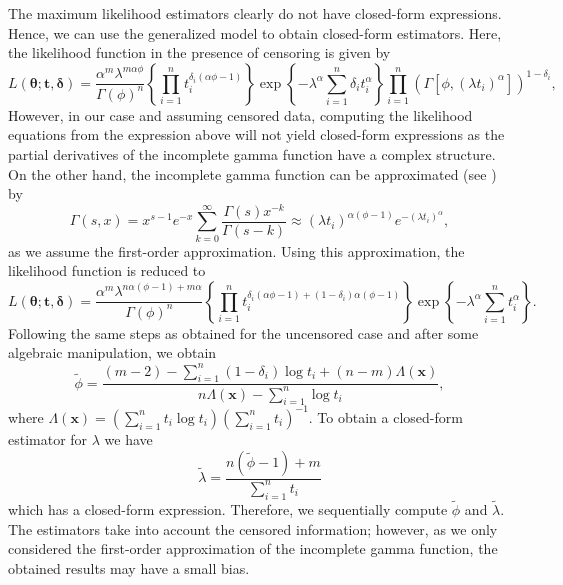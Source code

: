 \documentclass[10pt,a4paper,onecolumn]{article} %
\newcommand{\bs}{\boldsymbol}
\begin{document}
The maximum likelihood estimators clearly do not have closed-form expressions. Hence, we can use the generalized model to obtain closed-form estimators. Here, the likelihood function in the presence of censoring is given by
\begin{equation*}L(\boldsymbol{\theta; t,\delta})
=\frac{\alpha^m\lambda^{m\alpha\phi}}{\Gamma(\phi)^n}\left\{\prod_{i=1}^n{t_i^{\delta_i(\alpha\phi-1)}}\right\}\exp\left\{-\lambda^{\alpha}\sum_{i=1}^n {\delta_i}t_i^{\alpha}\right\}\prod_{i=1}^n\left(\Gamma[\phi,(\lambda t_i)^{\alpha}]\right)^{1-\delta_i},
\end{equation*}
 However, in our case and assuming censored data, computing the likelihood equations from the expression above will not yield closed-form expressions as the partial derivatives of the incomplete gamma function have a complex structure. On the other hand, the incomplete gamma function can be approximated (see \cite{abramowitz}) by
\begin{equation*} \Gamma(s,x) = x^{s-1}e^{-x}\sum_{k=0}^{\infty} \frac{\Gamma(s)x^{-k}}{\Gamma(s-k)}\approx (\lambda t_i)^{\alpha(\phi-1)}e^{-(\lambda t_i)^{\alpha}},
\end{equation*}
as we assume the first-order approximation. Using this approximation, the likelihood function is reduced to
\begin{equation*}L(\bs{\theta;t,\delta})
=\frac{\alpha^m\lambda^{n\alpha(\phi-1)+m\alpha}}{\Gamma(\phi)^n}\left\{\prod_{i=1}^n{t_i^{\delta_i(\alpha\phi-1)+(1-\delta_i)\alpha(\phi-1)}}\right\}\exp\left\{-\lambda^{\alpha}\sum_{i=1}^n t_i^{\alpha}\right\}.
\end{equation*}
Following the same steps as obtained for the uncensored case and after some algebraic manipulation, we obtain
\begin{equation}\label{init1} 
\tilde{\phi} = \frac{(m-2) - \sum_{i=1}^n(1-\delta_i)\log t_i + (n-m)\Lambda(\bs{x}) }{n\Lambda(\bs{x})-\sum_{i=1}^n \log t_i}, 
\end{equation}
where $\Lambda(\bs{x}) = \left(\sum_{i=1}^n t_i\log t_i\right)\left(\sum_{i=1}^n t_i\right)^{-1}$. To obtain a closed-form estimator for $\lambda$ we have
\begin{equation}\label{init2}
\tilde{\lambda} = \frac{n(\tilde{\phi}-1)+m}{\sum_{i=1}^n t_i}
\end{equation}
which has a closed-form expression. Therefore, we sequentially compute $\tilde{\phi}$ and $\tilde{\lambda}$. The estimators take into account the censored information; however, as we only considered the first-order approximation of the incomplete gamma function, the obtained results may have a small bias.
\end{document}
